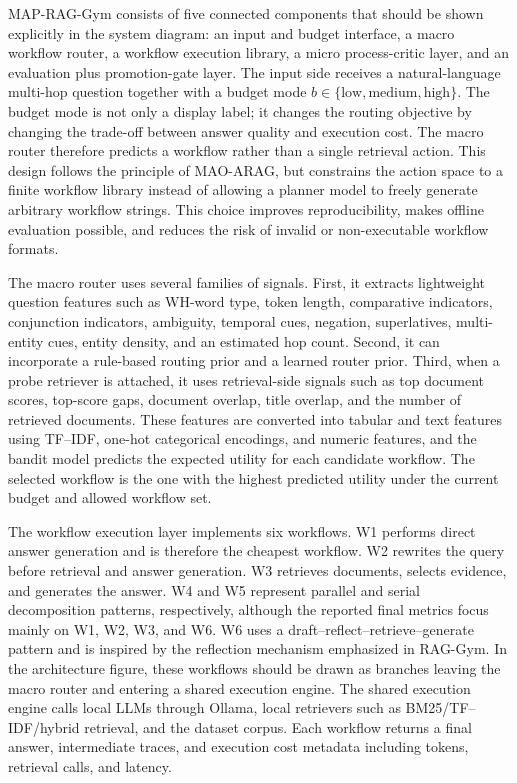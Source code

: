 \documentclass[12pt,a4paper]{article}
\begin{document}
MAP-RAG-Gym consists of five connected components that should be shown explicitly in the system diagram: an input and budget interface, a macro workflow router, a workflow execution library, a micro process-critic layer, and an evaluation plus promotion-gate layer. The input side receives a natural-language multi-hop question together with a budget mode $b \in \{\text{low},\text{medium},\text{high}\}$. The budget mode is not only a display label; it changes the routing objective by changing the trade-off between answer quality and execution cost. The macro router therefore predicts a workflow rather than a single retrieval action. This design follows the principle of MAO-ARAG, but constrains the action space to a finite workflow library instead of allowing a planner model to freely generate arbitrary workflow strings. This choice improves reproducibility, makes offline evaluation possible, and reduces the risk of invalid or non-executable workflow formats.

The macro router uses several families of signals. First, it extracts lightweight question features such as WH-word type, token length, comparative indicators, conjunction indicators, ambiguity, temporal cues, negation, superlatives, multi-entity cues, entity density, and an estimated hop count. Second, it can incorporate a rule-based routing prior and a learned router prior. Third, when a probe retriever is attached, it uses retrieval-side signals such as top document scores, top-score gaps, document overlap, title overlap, and the number of retrieved documents. These features are converted into tabular and text features using TF--IDF, one-hot categorical encodings, and numeric features, and the bandit model predicts the expected utility for each candidate workflow. The selected workflow is the one with the highest predicted utility under the current budget and allowed workflow set.

The workflow execution layer implements six workflows. W1 performs direct answer generation and is therefore the cheapest workflow. W2 rewrites the query before retrieval and answer generation. W3 retrieves documents, selects evidence, and generates the answer. W4 and W5 represent parallel and serial decomposition patterns, respectively, although the reported final metrics focus mainly on W1, W2, W3, and W6. W6 uses a draft--reflect--retrieve--generate pattern and is inspired by the reflection mechanism emphasized in RAG-Gym. In the architecture figure, these workflows should be drawn as branches leaving the macro router and entering a shared execution engine. The shared execution engine calls local LLMs through Ollama, local retrievers such as BM25/TF--IDF/hybrid retrieval, and the dataset corpus. Each workflow returns a final answer, intermediate traces, and execution cost metadata including tokens, retrieval calls, and latency.
\end{document}
